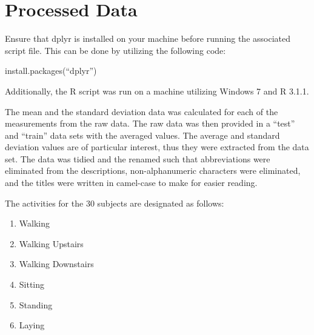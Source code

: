 \documentclass{article}
\begin{document}
\section{Processed Data}

Ensure that dplyr is installed on your machine before running the associated script file. This can be done by utilizing the following code: \par

install.packages(``dplyr'') \par

Additionally, the R script was run on a machine utilizing Windows 7 and R 3.1.1. \par

The mean and the standard deviation data was calculated for each of the measurements from the raw data. The raw data was then provided in a ``test'' and ``train'' data sets with the averaged values. The average and standard deviation values are of particular interest, thus they were extracted from the data set. The data was tidied and the renamed such that abbreviations were eliminated from the descriptions, non-alphanumeric characters were eliminated, and the titles were written in camel-case to make for easier reading. \par

The activities for the 30 subjects are designated as follows:
\begin{enumerate}
	\item Walking
	\item Walking Upstairs
	\item Walking Downstairs
	\item Sitting
	\item Standing
	\item Laying
\end{enumerate}
\end{document}
